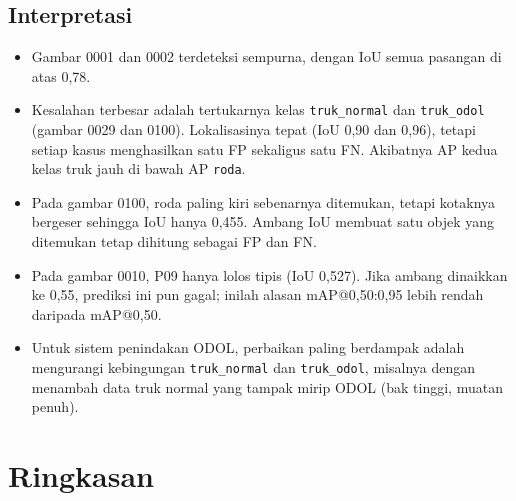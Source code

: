 \documentclass[12pt,a4paper]{article}
\newcommand{\kode}[1]{\texttt{#1}}
\begin{document}
\subsection{Interpretasi}
\begin{itemize}
\item Gambar 0001 dan 0002 terdeteksi sempurna, dengan IoU semua pasangan di atas 0,78.
\item Kesalahan terbesar adalah tertukarnya kelas \kode{truk\_normal} dan \kode{truk\_odol} (gambar 0029 dan 0100). Lokalisasinya tepat (IoU 0,90 dan 0,96), tetapi setiap kasus menghasilkan satu FP sekaligus satu FN. Akibatnya AP kedua kelas truk jauh di bawah AP \kode{roda}.
\item Pada gambar 0100, roda paling kiri sebenarnya ditemukan, tetapi kotaknya bergeser sehingga IoU hanya 0,455. Ambang IoU membuat satu objek yang ditemukan tetap dihitung sebagai FP dan FN.
\item Pada gambar 0010, P09 hanya lolos tipis (IoU 0,527). Jika ambang dinaikkan ke 0,55, prediksi ini pun gagal; inilah alasan mAP@0,50:0,95 lebih rendah daripada mAP@0,50.
\item Untuk sistem penindakan ODOL, perbaikan paling berdampak adalah mengurangi kebingungan \kode{truk\_normal} dan \kode{truk\_odol}, misalnya dengan menambah data truk normal yang tampak mirip ODOL (bak tinggi, muatan penuh).
\end{itemize}

\section{Ringkasan}
\end{document}
